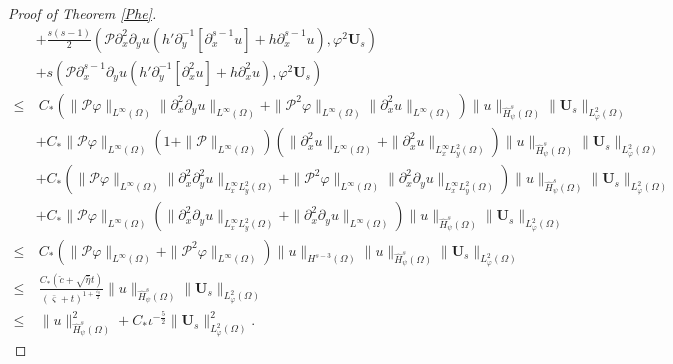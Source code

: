 \documentclass[10pt,a4paper]{amsart}
\begin{document}
\begin{proof}[Proof of Theorem \ref{Phe}]
\begin{align*}
 &+\frac{s(s-1)}{2}(\mathcal{P}\partial_{x}^{2}\partial_{y}u(h'\partial_{y}^{-1}[\partial_{x}^{s-1}u]+h\partial_{x}^{s-1}u),\varphi^{2}\mathbf{U}_{s})\\
 &+s(\mathcal{P}\partial_{x}^{s-1}\partial_{y}u(h'\partial_{y}^{-1}[\partial_{x}^{2}u]+h\partial_{x}^{2}u),\varphi^{2}\mathbf{U}_{s})\nonumber\\
\leq&~C_{*}(\|\mathcal{P}\varphi\|_{L^{\infty}(\Omega)}\|\partial_{x}^{2}\partial_{y}u\|_{L^{\infty}(\Omega)}
            +\|\mathcal{P}^{2}\varphi\|_{L^{\infty}(\Omega)}\|\partial_{x}^{2}u\|_{L^{\infty}(\Omega)})
           \|u\|_{\hat{H}_{\psi}^{s}(\Omega)}\|\mathbf{U}_{s}\|_{L_{\varphi}^{2}(\Omega)}\nonumber\\
    &+C_{*}\|\mathcal{P}\varphi\|_{L^{\infty}(\Omega)}(1+\|\mathcal{P}\|_{L^{\infty}(\Omega)})
           \left(\|\partial_{x}^{2}u\|_{L^{\infty}(\Omega)}+\|\partial_{x}^{2}u\|_{L_{x}^{\infty}L_{y}^{2}(\Omega)}\right)
           \|u\|_{\hat{H}_{\psi}^{s}(\Omega)}\|\mathbf{U}_{s}\|_{L_{\varphi}^{2}(\Omega)}\nonumber\\
    &+C_{*}(\|\mathcal{P}\varphi\|_{L^{\infty}(\Omega)}\|\partial_{x}^{2}\partial_{y}^{2}u\|_{L_{x}^{\infty}L_{y}^{2}(\Omega)}
            +\|\mathcal{P}^{2}\varphi\|_{L^{\infty}(\Omega)}\|\partial_{x}^{2}\partial_{y}u\|_{L_{x}^{\infty}L_{y}^{2}(\Omega)})
           \|u\|_{\hat{H}_{\psi}^{s}(\Omega)}\|\mathbf{U}_{s}\|_{L_{\varphi}^{2}(\Omega)}\nonumber\\
    &+C_{*}\|\mathcal{P}\varphi\|_{L^{\infty}(\Omega)}\left(\|\partial_{x}^{2}\partial_{y}u\|_{L_{x}^{\infty}L_{y}^{2}(\Omega)}
                                                     +\|\partial_{x}^{2}\partial_{y}u\|_{L^{\infty}(\Omega)}\right)
           \|u\|_{\hat{H}_{\psi}^{s}(\Omega)}\|\mathbf{U}_{s}\|_{L_{\varphi}^{2}(\Omega)}\nonumber\\
\leq&~C_{*}\left(\|\mathcal{P}\varphi\|_{L^{\infty}(\Omega)}+\|\mathcal{P}^{2}\varphi\|_{L^{\infty}(\Omega)}\right)
           \|u\|_{H^{s-3}(\Omega)}\|u\|_{\hat{H}_{\psi}^{s}(\Omega)}\|\mathbf{U}_{s}\|_{L_{\varphi}^{2}(\Omega)}\\
\leq&~\frac{C_{*}(\check{c}+\sqrt{\bar{\eta}}t)}{(\bar{\varsigma}+t)^{1+\frac{\varepsilon_{0}}{2}}}
      \|u\|_{\hat{H}_{\psi}^{s}(\Omega)}\|\mathbf{U}_{s}\|_{L_{\varphi}^{2}(\Omega)}\\
\leq&~\|u\|_{\hat{H}_{\psi}^{s}(\Omega)}^{2}
     +C_{*}\iota^{-\frac{5}{2}}\|\mathbf{U}_{s}\|_{L_{\varphi}^{2}(\Omega)}^{2}.
\end{align*}


\end{proof}
\end{document}

